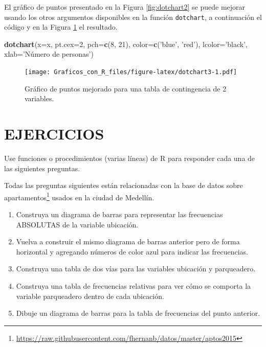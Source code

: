 \documentclass[10pt,]{krantz}
\makeatletter
\newenvironment{Shaded}{\begin{snugshade}}{\end{snugshade}}
\newcommand{\KeywordTok}[1]{\textcolor[rgb]{0.13,0.29,0.53}{\textbf{#1}}}
\newcommand{\DataTypeTok}[1]{\textcolor[rgb]{0.13,0.29,0.53}{#1}}
\newcommand{\DecValTok}[1]{\textcolor[rgb]{0.00,0.00,0.81}{#1}}
\newcommand{\StringTok}[1]{\textcolor[rgb]{0.31,0.60,0.02}{#1}}
\newcommand{\NormalTok}[1]{#1}
\providecommand{\tightlist}{%
  \setlength{\itemsep}{0pt}\setlength{\parskip}{0pt}}
\let\proglang=\textsf
\renewcommand{\href}[2]{#2\footnote{\url{#1}}}
\newenvironment{kframe}{%
\medskip{}
\setlength{\fboxsep}{.8em}
 \def\at@end@of@kframe{}%
 \ifinner\ifhmode%
  \def\at@end@of@kframe{\end{minipage}}%
  \begin{minipage}{\columnwidth}%
 \fi\fi%
 \def\FrameCommand##1{\hskip\@totalleftmargin \hskip-\fboxsep
 \colorbox{shadecolor}{##1}\hskip-\fboxsep
     \hskip-\linewidth \hskip-\@totalleftmargin \hskip\columnwidth}%
 \MakeFramed {\advance\hsize-\width
   \@totalleftmargin\z@ \linewidth\hsize
   \@setminipage}}%
 {\par\unskip\endMakeFramed%
 \at@end@of@kframe}
\renewenvironment{Shaded}{\begin{kframe}}{\end{kframe}}
\makeatother
\begin{document}
El gráfico de puntos presentado en la Figura \ref{fig:dotchart2} se
puede mejorar usando los otros argumentos disponibles en la función
\texttt{dotchart}, a continuación el código y en la Figura
\ref{fig:dotchart3} el resultado.

\begin{Shaded}
\begin{Highlighting}[]
\KeywordTok{dotchart}\NormalTok{(}\DataTypeTok{x=}\NormalTok{x,}
         \DataTypeTok{pt.cex=}\DecValTok{2}\NormalTok{, }\DataTypeTok{pch=}\KeywordTok{c}\NormalTok{(}\DecValTok{8}\NormalTok{, }\DecValTok{21}\NormalTok{), }\DataTypeTok{color=}\KeywordTok{c}\NormalTok{(}\StringTok{'blue'}\NormalTok{, }\StringTok{'red'}\NormalTok{),}
         \DataTypeTok{lcolor=}\StringTok{'black'}\NormalTok{, }
         \DataTypeTok{xlab=}\StringTok{'Número de personas'}\NormalTok{)}
\end{Highlighting}
\end{Shaded}

\begin{figure}
\centering
\texttt{[image: Graficos\_con\_R\_files/figure-latex/dotchart3-1.pdf]}
\caption{\label{fig:dotchart3}Gráfico de puntos mejorado para una tabla de
contingencia de 2 variables.}
\end{figure}

\section*{EJERCICIOS}\label{ejercicios}


Use funciones o procedimientos (varias líneas) de \proglang{R} para
responder cada una de las siguientes preguntas.

Todas las preguntas siguientes están relacionadas con la base de datos
sobre
\href{https://raw.githubusercontent.com/fhernanb/datos/master/aptos2015}{apartamentos}
usados en la ciudad de Medellín.

\begin{enumerate}
\def\labelenumi{\arabic{enumi}.}
\tightlist
\item
  Construya un diagrama de barras para representar las frecuencias
  ABSOLUTAS de la variable ubicación.
\item
  Vuelva a construir el mismo diagrama de barras anterior pero de forma
  horizontal y agregando números de color azul para indicar las
  frecuencias.
\item
  Construya una tabla de dos vías para las variables ubicación y
  parqueadero.
\item
  Construya una tabla de frecuencias relativas para ver cómo se comporta
  la variable parqueadero dentro de cada ubicación.
\item
  Dibuje un diagrama de barras para la tabla de frecuencias del punto
  anterior.
\end{enumerate}
\end{document}
